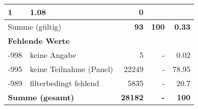 \begin{longtable}{lXrrr}
       \num{1} &
       \num[round-mode=places,round-precision=2]{1.08} &
         \num[round-mode=places,round-precision=2]{0} \\
     \midrule
     \multicolumn{2}{l}{Summe (gültig)} &
       \textbf{\num{93}} &
     \textbf{\num{100}} &
       \textbf{\num[round-mode=places,round-precision=2]{0.33}} \\
     \multicolumn{5}{l}{\textbf{Fehlende Werte}}\\
       -998 &
       keine Angabe &
         \num{5} &
        - &
         \num[round-mode=places,round-precision=2]{0.02} \\
       -995 &
       keine Teilnahme (Panel) &
         \num{22249} &
        - &
         \num[round-mode=places,round-precision=2]{78.95} \\
       -989 &
       filterbedingt fehlend &
         \num{5835} &
        - &
         \num[round-mode=places,round-precision=2]{20.7} \\
     \midrule
     \multicolumn{2}{l}{\textbf{Summe (gesamt)}} &
          \textbf{\num{28182}} &
        \textbf{-} &
        \textbf{\num{100}} \\
     \bottomrule
     \end{longtable}
     
